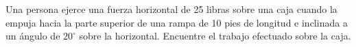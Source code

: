 \item Una persona ejerce una fuerza horizontal de 25 libras sobre una caja cuando la empuja hacia la parte superior de una rampa de 10 pies de longitud e inclinada a un ángulo de $20^\circ$ sobre la horizontal. Encuentre el trabajo efectuado sobre la caja.

